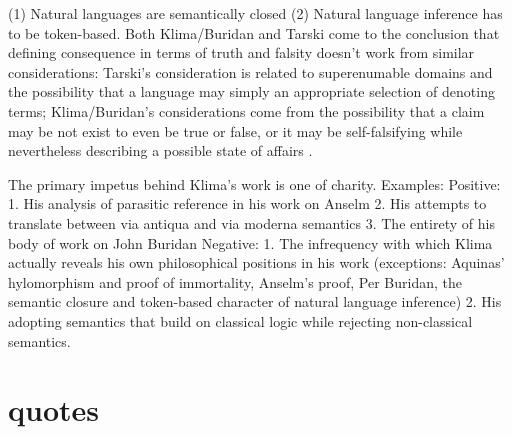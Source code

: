 \documentclass[]{article}
\begin{document}
(1) Natural languages are semantically closed (2) Natural language inference has to be token-based.
Both Klima/Buridan and Tarski come to the conclusion that defining consequence in terms of truth and falsity doesn't work from similar considerations: Tarski's consideration is related to superenumable domains and the possibility that a language may simply an appropriate selection of denoting terms; Klima/Buridan's considerations come from the possibility that a claim may be not exist to even be true or false, or it may be self-falsifying while nevertheless describing a possible state of affairs \autocite[96]{Klima2004}.

The primary impetus behind Klima's work is one of charity.
Examples: 
Positive:
1. His analysis of parasitic reference in his work on Anselm
2. His attempts to translate between via antiqua and via moderna semantics
3. The entirety of his body of work on John Buridan
Negative:
1. The infrequency with which Klima actually reveals his own philosophical positions in his work (exceptions: 
Aquinas' hylomorphism and proof of immortality, 
Anselm's proof, 
Per Buridan, the semantic closure and token-based character of natural language inference)
2. His adopting semantics that build on classical logic while rejecting non-classical semantics.




\section{quotes}
\end{document}
